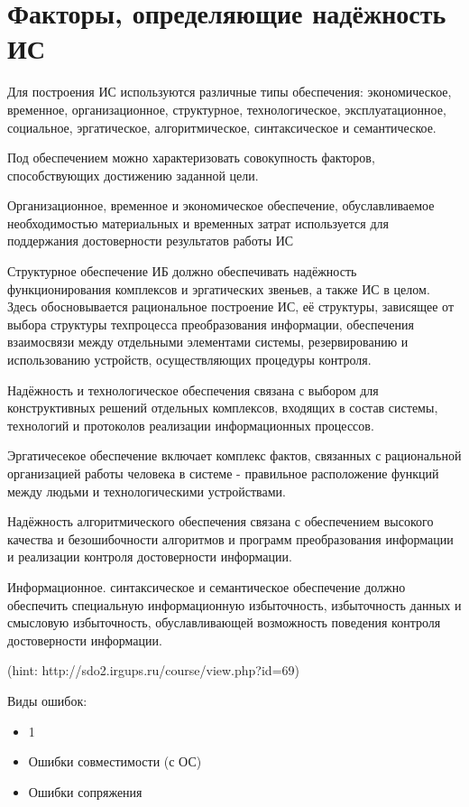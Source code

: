 \documentclass[a4paper, 12pt]{extarticle}
\begin{document}
	\section{Факторы, определяющие надёжность ИС}
		Для построения ИС используются различные типы обеспечения: экономическое, временное, организационное, структурное, технологическое, эксплуатационное, социальное, эргатическое, алгоритмическое, синтаксическое и семантическое.

		Под обеспечением можно характеризовать совокупность факторов, способствующих достижению заданной цели.

		Организационное, временное и экономическое обеспечение, обуславливаемое необходимостью материальных и временных затрат используется для поддержания достоверности результатов работы ИС

		Структурное обеспечение ИБ должно обеспечивать надёжность функционирования комплексов и эргатических звеньев, а также ИС в целом.
		Здесь обосновывается рациональное построение ИС, её структуры, зависящее от выбора структуры техпроцесса преобразования информации, обеспечения взаимосвязи между отдельными элементами системы, резервированию и использованию устройств, осуществляющих процедуры контроля.

		Надёжность и технологическое обеспечения связана с выбором для конструктивных решений отдельных комплексов, входящих в состав системы, технологий и протоколов реализации информационных процессов.

		Эргатичесекое обеспечение включает комплекс фактов, связанных с рациональной организацией работы человека в системе - правильное расположение функций между людьми и технологическими устройствами.

		Надёжность алгоритмического обеспечения связана с обеспечением высокого качества и безошибочности алгоритмов и программ преобразования информации и реализации контроля достоверности информации.

		Информационное. синтаксическое и семантическое обеспечение должно обеспечить специальную информационную избыточность, избыточность данных и смысловую избыточность, обуславливающей возможность поведения контроля достоверности информации.



		(hint: http://sdo2.irgups.ru/course/view.php?id=69)
		
		Виды ошибок:
		\begin{itemize}
			\item 1
			\item Ошибки совместимости (с ОС)
			\item Ошибки сопряжения
		\end{itemize}
		
\end{document}
